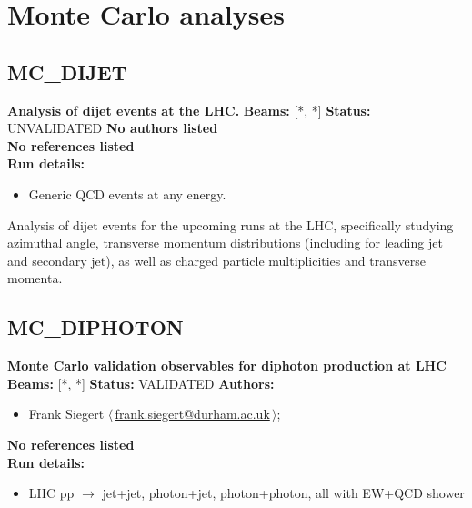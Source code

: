 \clearpage


\section{Monte Carlo analyses}\subsection{MC\_DIJET}
\textbf{Analysis of dijet events at the LHC.}\newline
\textbf{Beams:} [*, *] \newline
\textbf{Status:} UNVALIDATED\newline
\textbf{No authors listed}\\ 
\textbf{No references listed}\\ 
\textbf{Run details:}
\begin{itemize}

  \item Generic QCD events at any energy.\end{itemize}

\noindent Analysis of dijet events for the upcoming runs at the LHC, specifically studying azimuthal angle, transverse momentum distributions (including for leading jet and secondary jet), as well as charged particle multiplicities and transverse momenta.

\clearpage


\clearpage

\subsection{MC\_DIPHOTON}
\textbf{Monte Carlo validation observables for diphoton production at LHC}\newline
\textbf{Beams:} [*, *] \newline
\textbf{Status:} VALIDATED\newline
\textbf{Authors:}
\begin{itemize}
  \item Frank Siegert $\langle\,$\href{mailto:frank.siegert@durham.ac.uk}{frank.siegert@durham.ac.uk}$\,\rangle$;
\end{itemize}
\textbf{No references listed}\\ 
\textbf{Run details:}
\begin{itemize}

  \item LHC pp \ensuremath{\to} jet+jet, photon+jet, photon+photon, all with EW+QCD shower\end{itemize}


